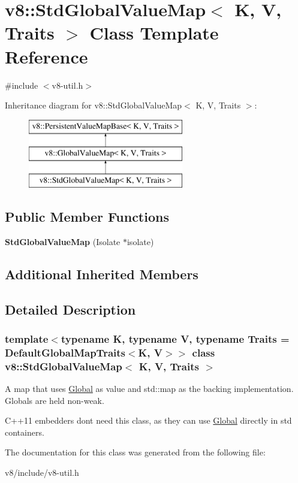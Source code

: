 \hypertarget{classv8_1_1StdGlobalValueMap}{}\section{v8\+:\+:Std\+Global\+Value\+Map$<$ K, V, Traits $>$ Class Template Reference}
\label{classv8_1_1StdGlobalValueMap}


{\ttfamily \#include $<$v8-\/util.\+h$>$}

Inheritance diagram for v8\+:\+:Std\+Global\+Value\+Map$<$ K, V, Traits $>$\+:\begin{figure}[H]
\begin{center}
\leavevmode
\includegraphics[height=3.000000cm]{classv8_1_1StdGlobalValueMap}
\end{center}
\end{figure}
\subsection*{Public Member Functions}
\begin{DoxyCompactItemize}
\item 
\mbox{\label{classv8_1_1StdGlobalValueMap_af1025915a269b8b37af93ffc2ad5c3b1}} 
{\bfseries Std\+Global\+Value\+Map} (Isolate $\ast$isolate)
\end{DoxyCompactItemize}
\subsection*{Additional Inherited Members}


\subsection{Detailed Description}
\subsubsection*{template$<$typename K, typename V, typename Traits = Default\+Global\+Map\+Traits$<$\+K, V$>$$>$\newline
class v8\+::\+Std\+Global\+Value\+Map$<$ K, V, Traits $>$}

A map that uses \mbox{\hyperlink{classv8_1_1Global}{Global}} as value and std\+::map as the backing implementation. Globals are held non-\/weak.

C++11 embedders don\textquotesingle{}t need this class, as they can use \mbox{\hyperlink{classv8_1_1Global}{Global}} directly in std containers. 

The documentation for this class was generated from the following file\+:\begin{DoxyCompactItemize}
\item 
v8/include/v8-\/util.\+h\end{DoxyCompactItemize}
